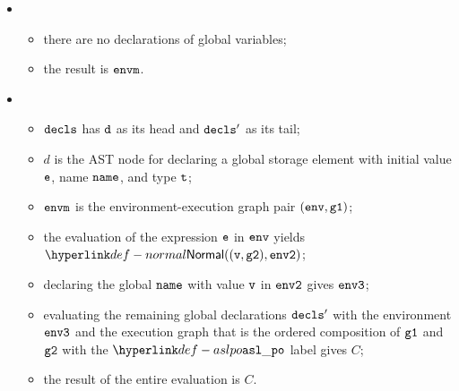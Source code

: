 \ProseParagraph
\OneApplies
\begin{itemize}
  \item {}
  \begin{itemize}
    \item there are no declarations of global variables;
    \item the result is $\envm$.
  \end{itemize}

  \item {}
  \begin{itemize}
    \item $\vdecls$ has $\vd$ as its head and $\vdecls'$ as its tail;
    \item $d$ is the AST node for declaring a global storage element with initial value $\ve$,
          name $\name$, and type $\vt$;
    \item $\envm$ is the environment-execution graph pair $(\env, \vgone)$;
    \item the evaluation of the expression $\ve$ in $\env$ yields $\Normal((\vv, \vgtwo), \envtwo)$\ProseOrAbnormal;
    \item declaring the global $\name$ with value $\vv$ in $\envtwo$ gives $\envthree$;
    \item evaluating the remaining global declarations $\vdecls'$ with the environment $\envthree$ and the execution graph
          that is the ordered composition of $\vgone$ and $\vgtwo$ with the $\aslpo$ label gives $C$;
    \item the result of the entire evaluation is $C$.
  \end{itemize}
\end{itemize}

\FormallyParagraph
\begin{mathpar}
\end{mathpar}

\begin{mathpar}
\end{mathpar}

